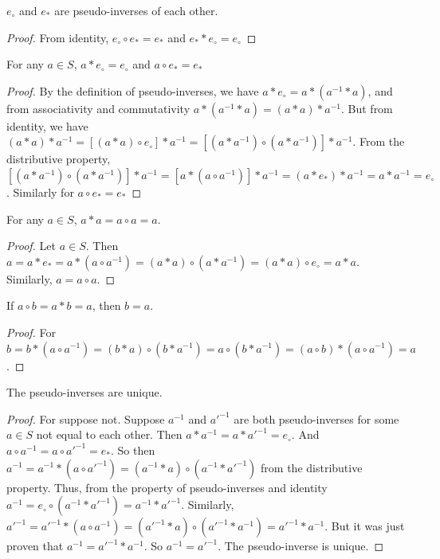 \documentclass[crop=false,class=book,oneside]{standalone}
\begin{document}
            \begin{theorem} $e_{\circ}$ and $e_{*}$ are pseudo-inverses of each other.
            \end{theorem}
            \begin{proof} From identity, $e_{\circ}\circ e_{*}=e_{*}$ and $e_{*}*e_{\circ}=e_{\circ}$
            \end{proof}
            \begin{theorem} For any $a\in S$, $a*e_{\circ}=e_{\circ}$ and $a\circ e_{*}=e_{*}$
            \end{theorem}
            \begin{proof} By the definition of pseudo-inverses, we have $a*e_{\circ}=a*(a^{-1}*a)$, and from associativity and commutativity $a*(a^{-1}*a)=(a*a)*a^{-1}$. But from identity, we have $(a*a)*a^{-1}=[(a*a)\circ e_{\circ}]*a^{-1}=[(a*a^{-1})\circ (a*a^{-1})]*a^{-1}$. From the distributive property, $[(a*a^{-1})\circ (a*a^{-1})]*a^{-1}=[a*(a\circ a^{-1})]*a^{-1}=(a*e_{*})*a^{-1}=a*a^{-1}=e_{\circ}$. Similarly for $a\circ e_{*}=e_{*}$
            \end{proof}
            \begin{theorem} For any $a\in S$, $a*a = a\circ a = a$.
            \end{theorem}
            \begin{proof} Let $a\in S$. Then $a=a*e_{*}=a*(a\circ a^{-1})=(a*a)\circ(a*a^{-1})=(a*a)\circ e_{\circ}=a*a$. Similarly, $a=a\circ a$.
            \end{proof}
            \begin{theorem} If $a\circ b = a*b = a$, then $b=a$. 
            \end{theorem}
            \begin{proof}
            For $b = b*(a\circ a^{-1}) = (b*a)\circ(b* a^{-1})= a\circ (b* a^{-1}) = (a\circ b)*(a\circ a^{-1}) = a$.
            \end{proof}
            \begin{theorem} The pseudo-inverses are unique.
            \end{theorem}
            \begin{proof} For suppose not. Suppose $a^{-1}$ and $a'^{-1}$ are both pseudo-inverses for some $a\in S$ not equal to each other.  Then $a*a^{-1}=a* a'^{-1}=e_{\circ}$. And $a\circ a^{-1}=a\circ a'^{-1}=e_{*}$. So then $a^{-1}=a^{-1}*(a\circ a'^{-1})=(a^{-1}*a)\circ (a^{-1}*a'^{-1})$ from the distributive property. Thus, from the property of pseudo-inverses and identity $a^{-1}=e_{\circ}\circ (a^{-1}*a'^{-1})=a^{-1}*a'^{-1}$. Similarly, $a'^{-1}=a'^{-1}*(a\circ a^{-1})=(a'^{-1}*a)\circ (a'^{-1}*a^{-1})=a'^{-1}*a^{-1}$. But it was just proven that $a^{-1}=a'^{-1}*a^{-1}$. So $a^{-1}=a'^{-1}$. The pseudo-inverse is unique.
            \end{proof}
\end{document}
